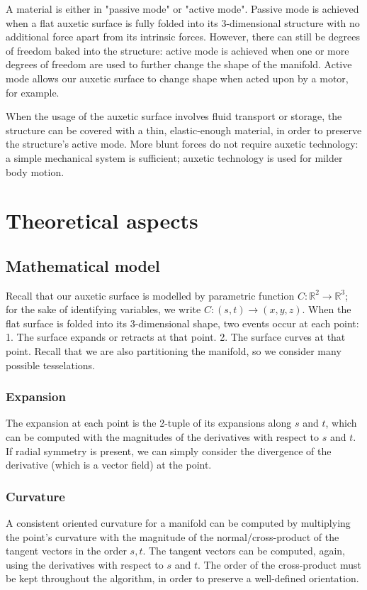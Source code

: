 \documentclass{article}
\begin{document}
A material is either in "passive mode" or "active mode". Passive mode is achieved when a flat auxetic surface is fully folded into its 3-dimensional structure with no additional force apart from its intrinsic forces. However, there can still be degrees of freedom baked into the structure: active mode is achieved when one or more degrees of freedom are used to further change the shape of the manifold. Active mode allows our auxetic surface to change shape when acted upon by a motor, for example.

When the usage of the auxetic surface involves fluid transport or storage, the structure can be covered with a thin, elastic-enough material, in order to preserve the structure's active mode. More blunt forces do not require auxetic technology: a simple mechanical system is sufficient; auxetic technology is used for milder body motion.


\section{Theoretical aspects}

\subsection{Mathematical model}
Recall that our auxetic surface is modelled by parametric function $ C: \mathbb{R}^2 \rightarrow \mathbb{R}^3 $; for the sake of identifying variables, we write $ C: (s, t) \rightarrow (x, y, z) $. When the flat surface is folded into its 3-dimensional shape, two events occur at each point:
1. The surface expands or retracts at that point.
2. The surface curves at that point.
Recall that we are also partitioning the manifold, so we consider many possible tesselations.

\subsubsection{Expansion}
The expansion at each point is the 2-tuple of its expansions along $s$ and $t$, which can be computed with the magnitudes of the derivatives with respect to $s$ and $t$. If radial symmetry is present, we can simply consider the divergence of the derivative (which is a vector field) at the point.

\subsubsection{Curvature}
A consistent oriented curvature for a manifold can be computed by multiplying the point's curvature with the magnitude of the normal/cross-product of the tangent vectors in the order $s, t$. The tangent vectors can be computed, again, using the derivatives with respect to $s$ and $t$. The order of the cross-product must be kept throughout the algorithm, in order to preserve a well-defined orientation.
\end{document}
